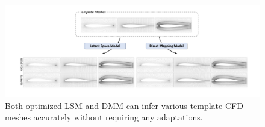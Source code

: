 \begin{figure}[!htb]
    \begin{center}
        \includegraphics[width=1\linewidth]{chapter4/fig/infer_different_templates.pdf}
    \end{center}
    \caption{
        \small Both optimized LSM and DMM can infer various template CFD meshes accurately without requiring any adaptations.
    }
    \label{ch4:fig:infer_different_templates}
\end{figure}